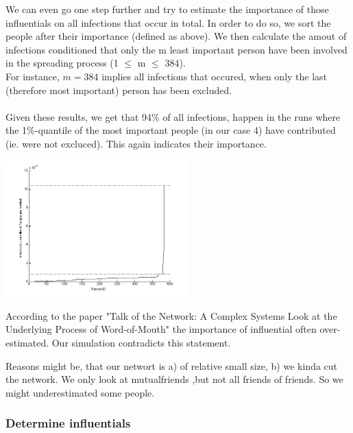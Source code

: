 We can even go one step further and try to estimate the importance of those influentials on all infections that occur in total. In order to do so, we sort the people after their importance (defined as above). We then calculate the amout of infections conditioned that only the m least important person have been involved in the spreading process (1 $\le$ m $\le$ 384).\\
For instance, $m=384$ implies all infections that occured, when only the last (therefore most important) person has been excluded.\\
\\
Given these results, we get that 94\% of all infections, happen in the runs where the 1\%-quantile of the most important people (in our case 4) have contributed (ie. were not excluced). This again indicates their importance.

\includegraphics[width=7cm]{influ3}


According to the paper "Talk of the Network: A Complex Systems Look at the Underlying Process of Word-of-Mouth" the importance of influential often over-estimated. Our simulation contradicts this statement. 

Reasons might be, that our networt is a) of relative small size, b) we kinda cut the network. We only look at mutualfriends ,but not all friends of friends. So we might underestimated some people. 

\subsubsection{Determine influentials}